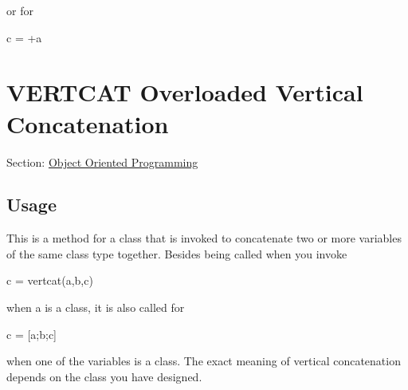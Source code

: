  or for \begin{DoxyVerb}   c = +a
\end{DoxyVerb}
 \hypertarget{class_vertcat}{}\section{V\-E\-R\-T\-C\-A\-T Overloaded Vertical Concatenation}\label{class_vertcat}
Section\-: \hyperlink{sec_class}{Object Oriented Programming} \hypertarget{vtkwidgets_vtkxyplotwidget_Usage}{}\subsection{Usage}\label{vtkwidgets_vtkxyplotwidget_Usage}
This is a method for a class that is invoked to concatenate two or more variables of the same class type together. Besides being called when you invoke \begin{DoxyVerb}   c = vertcat(a,b,c)
\end{DoxyVerb}
 when {\ttfamily a} is a class, it is also called for \begin{DoxyVerb}   c = [a;b;c]
\end{DoxyVerb}
 when one of the variables is a class. The exact meaning of vertical concatenation depends on the class you have designed. 